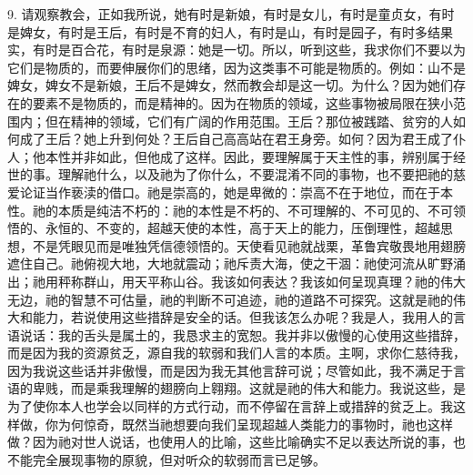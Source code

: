 9. 请观察教会，正如我所说，她有时是新娘，有时是女儿，有时是童贞女，有时是婢女，有时是王后，有时是不育的妇人，有时是山，有时是园子，有时多结果实，有时是百合花，有时是泉源：她是一切。\newline{}所以，听到这些，我求你们不要以为它们是物质的，而要伸展你们的思绪，因为这类事不可能是物质的。例如：山不是婢女，婢女不是新娘，王后不是婢女，然而教会却是这一切。为什么？因为她们存在的要素不是物质的，而是精神的。因为在物质的领域，这些事物被局限在狭小范围内；但在精神的领域，它们有广阔的作用范围。\newline{}\newline{}王后？那位被践踏、贫穷的人如何成了王后？她上升到何处？王后自己高高站在君王身旁。如何？因为君王成了仆人；他本性并非如此，但他成了这样。\newline{}因此，要理解属于天主性的事，辨别属于经世的事。理解祂什么，以及祂为了你什么，不要混淆不同的事物，也不要把祂的慈爱论证当作亵渎的借口。\newline{}祂是崇高的，她是卑微的：崇高不在于地位，而在于本性。祂的本质是纯洁不朽的：祂的本性是不朽的、不可理解的、不可见的、不可领悟的、永恒的、不变的，超越天使的本性，高于天上的能力，压倒理性，超越思想，不是凭眼见而是唯独凭信德领悟的。天使看见祂就战栗，革鲁宾敬畏地用翅膀遮住自己。\newline{}祂俯视大地，大地就震动；祂斥责大海，使之干涸：祂使河流从旷野涌出；祂用秤称群山，用天平称山谷。\newline{}我该如何表达？我该如何呈现真理？祂的伟大无边，祂的智慧不可估量，祂的判断不可追迹，祂的道路不可探究。这就是祂的伟大和能力，若说使用这些措辞是安全的话。\newline{}但我该怎么办呢？我是人，我用人的言语说话：我的舌头是属土的，我恳求主的宽恕。我并非以傲慢的心使用这些措辞，而是因为我的资源贫乏，源自我的软弱和我们人言的本质。主啊，求你仁慈待我，因为我说这些话并非傲慢，而是因为我无其他言辞可说；尽管如此，我不满足于言语的卑贱，而是乘我理解的翅膀向上翱翔。\newline{}这就是祂的伟大和能力。我说这些，是为了使你本人也学会以同样的方式行动，而不停留在言辞上或措辞的贫乏上。我这样做，你为何惊奇，既然当祂想要向我们呈现超越人类能力的事物时，祂也这样做？因为祂对世人说话，也使用人的比喻，这些比喻确实不足以表达所说的事，也不能完全展现事物的原貌，但对听众的软弱而言已足够。\par

